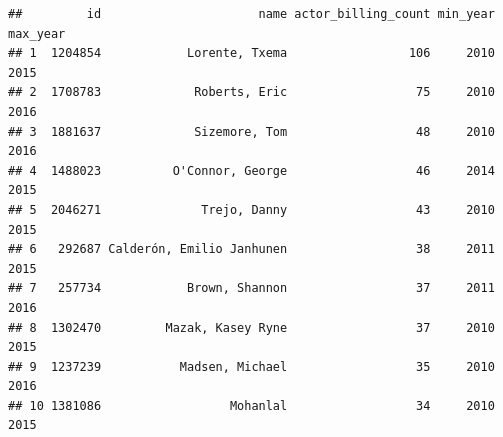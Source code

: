 \documentclass[]{article}
\begin{document}
\begin{verbatim}
##         id                      name actor_billing_count min_year max_year
## 1  1204854            Lorente, Txema                 106     2010     2015
## 2  1708783             Roberts, Eric                  75     2010     2016
## 3  1881637             Sizemore, Tom                  48     2010     2016
## 4  1488023          O'Connor, George                  46     2014     2015
## 5  2046271              Trejo, Danny                  43     2010     2015
## 6   292687 Calderón, Emilio Janhunen                  38     2011     2015
## 7   257734            Brown, Shannon                  37     2011     2016
## 8  1302470         Mazak, Kasey Ryne                  37     2010     2015
## 9  1237239           Madsen, Michael                  35     2010     2016
## 10 1381086                  Mohanlal                  34     2010     2015
\end{verbatim}
\end{document}
